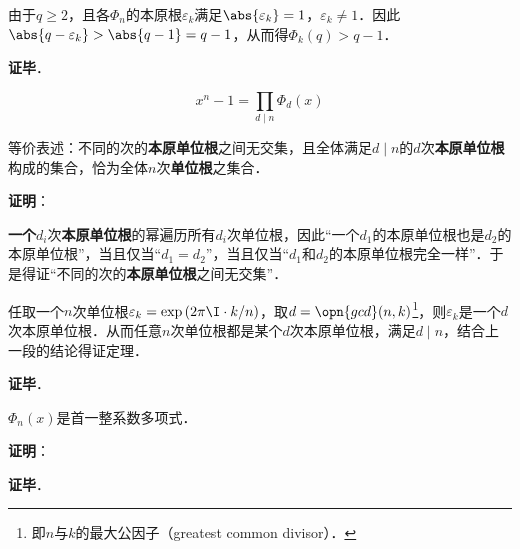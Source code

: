 由于$q\geq 2$，且各$\Phi_n$的本原根$\varepsilon_k$满足$\abs{\varepsilon_k}=1$，$\varepsilon_k\neq 1$．因此$\abs{q-\varepsilon_k}>\abs{q-1}=q-1$，从而得$\Phi_k(q)>q-1$．


\textbf{证毕}．




\begin{theorem}{}
\begin{equation}
x^n-1 = \prod_{d\mid n}\Phi_d(x)
\end{equation}

等价表述：不同的次的\textbf{本原单位根}之间无交集，且全体满足$d\mid n$的$d$次\textbf{本原单位根}构成的集合，恰为全体$n$次\textbf{单位根}之集合．
\end{theorem}

\textbf{证明}：

\textbf{一个}$d_i$次\textbf{本原单位根}的幂遍历所有$d_i$次单位根，因此“一个$d_1$的本原单位根也是$d_2$的本原单位根”，当且仅当“$d_1=d_2$”，当且仅当“$d_1$和$d_2$的本原单位根完全一样”．于是得证“不同的次的\textbf{本原单位根}之间无交集”．

任取一个$n$次单位根$\varepsilon_k=\exp{(2\pi\I\cdot  k/n)}$，取$d=\opn{gcd}(n, k)$\footnote{即$n$与$k$的最大公因子（greatest common divisor）．}，则$\varepsilon_k$是一个$d$次本原单位根．从而任意$n$次单位根都是某个$d$次本原单位根，满足$d\mid n$，结合上一段的结论得证定理．

\textbf{证毕}．



\begin{theorem}{}
$\Phi_n(x)$是首一整系数多项式．
\end{theorem}

\textbf{证明}：



\textbf{证毕}．

























